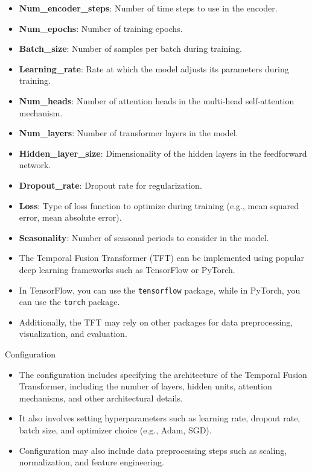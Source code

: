 \begin{frame}
\begin{itemize}[label=--]
	\item \textbf{Num\_encoder\_steps}: Number of time steps to use in the encoder.
	\item \textbf{Num\_epochs}: Number of training epochs.
	\item \textbf{Batch\_size}: Number of samples per batch during training.
	\item \textbf{Learning\_rate}: Rate at which the model adjusts its parameters during training.
	\item \textbf{Num\_heads}: Number of attention heads in the multi-head self-attention mechanism.
	\item \textbf{Num\_layers}: Number of transformer layers in the model.
	\item \textbf{Hidden\_layer\_size}: Dimensionality of the hidden layers in the feedforward network.
	\item \textbf{Dropout\_rate}: Dropout rate for regularization.
	\item \textbf{Loss}: Type of loss function to optimize during training (e.g., mean squared error, mean absolute error).
	\item \textbf{Seasonality}: Number of seasonal periods to consider in the model.
\end{itemize}
\end{frame}



\newpage
{}	
	
\begin{frame}
\begin{itemize}[label=--]
	\item The Temporal Fusion Transformer (TFT) can be implemented using popular deep learning frameworks such as TensorFlow or PyTorch.
	\item In TensorFlow, you can use the \texttt{tensorflow} package, while in PyTorch, you can use the \texttt{torch} package.
	\item Additionally, the TFT may rely on other packages for data preprocessing, visualization, and evaluation.
\end{itemize}
\end{frame}
	
	

			
\begin{frame}{Configuration}
\begin{itemize}[label=--]
	\item The configuration includes specifying the architecture of the Temporal Fusion Transformer, including the number of layers, hidden units, attention mechanisms, and other architectural details.
	\item It also involves setting hyperparameters such as learning rate, dropout rate, batch size, and optimizer choice (e.g., Adam, SGD).
	\item Configuration may also include data preprocessing steps such as scaling, normalization, and feature engineering.
\end{itemize}
\end{frame}

